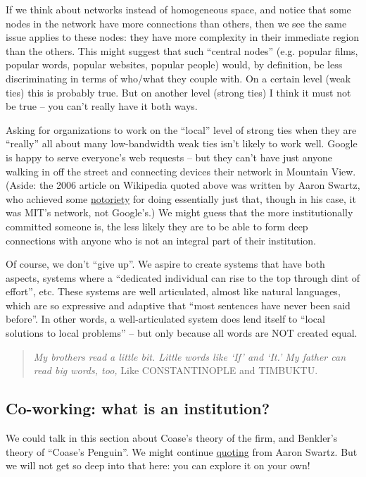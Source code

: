 If we think about networks instead of homogeneous space, and notice that
some nodes in the network have more connections than others, then we see
the same issue applies to these nodes: they have more complexity in
their immediate region than the others. This might suggest that such
``central nodes'' (e.g. popular films, popular words, popular websites,
popular people) would, by definition, be less discriminating in terms of
who/what they couple with. On a certain level (weak ties) this is
probably true. But on another level (strong ties) I think it must not be
true -- you can't really have it both ways.

Asking for organizations to work on the ``local'' level of strong ties
when they are ``really'' all about many low-bandwidth weak ties isn't
likely to work well. Google is happy to serve everyone's web requests --
but they can't have just anyone walking in off the street and connecting
devices their network in Mountain View. (Aside: the 2006 article on
Wikipedia quoted above was written by Aaron Swartz, who achieved some
\href{http://www.wired.com/threatlevel/2011/07/swartz-arrest/}{notoriety}
for doing essentially just that, though in his case, it was MIT's
network, not Google's.) We might guess that the more institutionally
committed someone is, the less likely they are to be able to form deep
connections with anyone who is not an integral part of their
institution.

Of course, we don't ``give up''. We aspire to create systems that have
both aspects, systems where a ``dedicated individual can rise to the top
through dint of effort'', etc. These systems are well articulated,
almost like natural languages, which are so expressive and adaptive that
``most sentences have never been said before''. In other words, a
well-articulated system does lend itself to ``local solutions to local
problems'' -- but only because all words are NOT created equal.

\begin{quote}
\emph{My brothers read a little bit. Little words like `If' and `It.' My
father can read big words, too,} Like CONSTANTINOPLE and TIMBUKTU.
\end{quote}

\subsection{Co-working: what is an institution?}

We could talk in this section about Coase's theory of the firm, and
Benkler's theory of ``Coase's Penguin''. We might continue
\href{http://www.aaronsw.com/weblog/perfectinstitutions}{quoting} from
Aaron Swartz. But we will not get so deep into that here: you can
explore it on your own!
